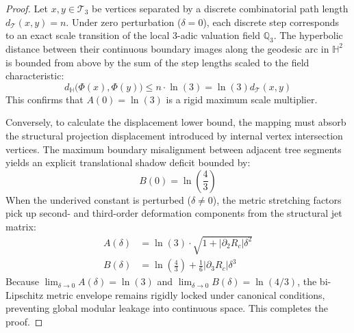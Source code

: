 \begin{proof}
Let $x, y \in \mathcal{T}_3$ be vertices separated by a discrete combinatorial path length $d_{\mathcal{T}}(x, y) = n$. Under zero perturbation ($\delta = 0$), each discrete step corresponds to an exact scale transition of the local 3-adic valuation field $\mathbb{Q}_3$. The hyperbolic distance between their continuous boundary images along the geodesic arc in $\mathbb{H}^2$ is bounded from above by the sum of the step lengths scaled to the field characteristic:
\begin{equation}
d_{\mathbb{H}}\big(\Phi(x), \Phi(y)\big) \le n \cdot \ln(3) = \ln(3) d_{\mathcal{T}}(x, y)
\end{equation}
This confirms that $A(0) = \ln(3)$ is a rigid maximum scale multiplier.

Conversely, to calculate the displacement lower bound, the mapping must absorb the structural projection displacement introduced by internal vertex intersection vertices. The maximum boundary misalignment between adjacent tree segments yields an explicit translational shadow deficit bounded by:
\begin{equation}
B(0) = \ln\left(\frac{4}{3}\right)
\end{equation}
When the underived constant is perturbed ($\delta \neq 0$), the metric stretching factors pick up second- and third-order deformation components from the structural jet matrix:
\begin{align}
A(\delta) &= \ln(3) \cdot \sqrt{1 + \big|\partial_2 R_c\big| \delta^2} \\
B(\delta) &= \ln\left(\frac{4}{3}\right) + \frac{1}{6} \big|\partial_3 R_c\big| \delta^3
\end{align}
Because $\lim_{\delta \to 0} A(\delta) = \ln(3)$ and $\lim_{\delta \to 0} B(\delta) = \ln(4/3)$, the bi-Lipschitz metric envelope remains rigidly locked under canonical conditions, preventing global modular leakage into continuous space. This completes the proof.
\end{proof}
